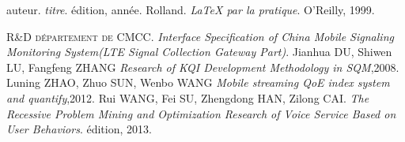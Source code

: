 \begin{thebibliography}{ABC}	
     auteur. \emph{titre}. édition, année.
     Rolland. \emph{LaTeX par la pratique}. O'Reilly, 1999.
    
    R\&D \textsc{département de }CMCC.   \emph{Interface Specification of China Mobile Signaling Monitoring System(LTE Signal Collection Gateway Part)}.
    Jianhua DU, Shiwen LU, Fangfeng ZHANG  \emph{Research of KQI Development Methodology in SQM},2008.
    Luning ZHAO, Zhuo SUN, Wenbo WANG  \emph{Mobile streaming QoE index system and quantify},2012.
     Rui WANG, Fei SU, Zhengdong HAN, Zilong CAI. \emph{The Recessive Problem Mining and Optimization Research of Voice Service Based on User Behaviors}. édition, 2013.
\end{thebibliography}